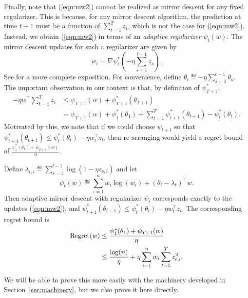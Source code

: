 \documentclass[paper_icml.tex]{subfiles}
\begin{document}
Finally, note that (\ref{eqn:mw2}) cannot be realized as mirror descent for any 
fixed regularizer. This is because, for any mirror descent algorithm, the 
prediction at time $t+1$ must be a function of $\sum_{t=1}^T z_t$, which is 
not the case for (\ref{eqn:mw2}). Instead, we obtain (\ref{eqn:mw2}) in terms of 
an \emph{adaptive regularizer} $\psi_t(w)$. The mirror descent updates for 
such a regularizer are given by 
\[ w_{t} = \nabla \psi_t^*\left(-\eta \sum_{s=1}^{t-1} z_s\right). \]
See \cite{orabona2013general} for a more complete exposition. For convenience, 
define $\theta_t \eqdef -\eta \sum_{s=1}^{t-1} \theta_s$. The important 
observation in our context is that, by definition of $\psi_{T+1}^*$, 
\begin{align}
- \eta w^{\top} \sum_{t=1}^T z_t &\leq \psi_{T+1}(w) + \psi_{T+1}^*(\theta_{T+1}) \\
\label{eqn:telescope}
 &= \psi_{T+1}(w) + \psi_1^*(\theta_1) + \sum_{t=1}^T \psi_{t+1}^*(\theta_{t+1}) - \psi_t^*(\theta_t).
\end{align}
Motivated by this, we note that if we could choose $\psi_{t+1}$ so that 
$\psi_{t+1}^*(\theta_{t+1}) \leq \psi_{t}^*(\theta_t) - \eta w_t^{\top}z_t$, 
then re-arranging would yield a regret bound of $\frac{\psi_1^*(\theta_1) + \psi_{T+1}(w)}{\eta}$.
\begin{proposition}
\label{prop:correspondence}
Define $\lambda_{t,i} \eqdef \sum_{s=1}^{t-1} \log(1-\eta z_{s,i})$ and let
\[ \psi_t(w) \eqdef \sum_{i=1}^n w_i\log(w_i) + (\theta_t - \lambda_t)^{\top}w. \]
Then adaptive mirror descent with regularizer $\psi_t$ corresponds exactly to 
the updates (\ref{eqn:mw2}), and 
$\psi_{t+1}^*(\theta_{t+1}) \leq \psi_t^*(\theta_t) - \eta w_t^{\top}z_t$. 
The corresponding regret bound is
\begin{align}
\operatorname{Regret}(w) &\leq \frac{\psi_1^*(\theta_1) + \psi_{T+1}(w)}{\eta} \\
 &\leq \frac{\log(n)}{\eta} + \eta \sum_{i=1}^n w_i \sum_{t=1}^T z_{t,i}^2.
\end{align}
\end{proposition}
We will be able to prove this more easily with the machinery developed in 
Section~\ref{sec:machinery}, but we also prove it here directly.
\end{document}
